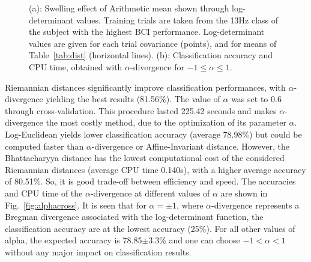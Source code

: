 
\begin{figure}[h!]
\centering
{}
\caption{(a): Swelling effect of Arithmetic mean shown through log-determinant values. Training trials are taken from the 13Hz class of the subject with the highest BCI performance. Log-determinant values are given for each trial covariance (points), and for means of Table~\ref{tab:dist} (horizontal lines). (b): Classification accuracy and CPU time, obtained with $\alpha$-divergence for $-1\leqslant \alpha  \leqslant 1$.} 
\label{fig:swel_alpha}
\end{figure} 

Riemannian distances significantly improve classification performances, with $\alpha$-divergence yielding the best results (81.56\%). 
The value of $\alpha$ was set to 0.6 through cross-validation. 
This procedure lasted 225.42 seconds and makes $\alpha$-divergence the most costly method, due to the optimization of its parameter $\alpha$. 
Log-Euclidean yields lower classification accuracy (average 78.98\%) but could be computed faster than $\alpha$-divergence or Affine-Invariant distance.
However, the Bhattacharyya distance has the lowest computational cost of the considered Riemannian distances (average CPU time 0.140s), with a higher average accuracy of 80.51\%. 
So, it is good trade-off between efficiency and speed. 
The accuracies and CPU time of the $\alpha$-divergence at different values of $\alpha$ are shown in Fig.~\ref{fig:alphacross}.
It is seen that for $\alpha = \pm 1$, where $\alpha$-divergence represents a Bregman divergence associated with the log-determinant function, %
the classification accuracy are at the lowest accuracy (25\%). 
For all other values of alpha, the expected accuracy is 78.85$\pm$3.3\% and one can choose $-1 < \alpha < 1$ without any major impact on classification results.

